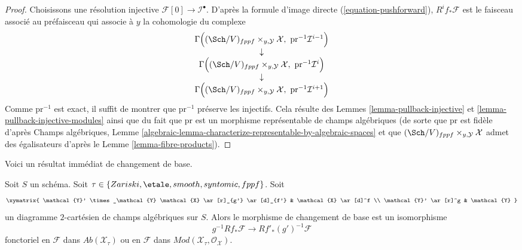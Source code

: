 \begin{proof}
Choisissons une résolution injective $\mathcal{F}[0] \to \mathcal{I}^\bullet$.
D'après la formule d'image directe (\ref{equation-pushforward}),
$R^if_*\mathcal{F}$ est le faisceau associé au préfaisceau qui associe
à $y$ la cohomologie du complexe
$$
\begin{matrix}
\Gamma\Big((\Sch/V)_{fppf} \times_{y, \mathcal{Y}} \mathcal{X},
\ \text{pr}^{-1}\mathcal{I}^{i - 1}\Big) \\
\downarrow \\
\Gamma\Big((\Sch/V)_{fppf} \times_{y, \mathcal{Y}} \mathcal{X},
\ \text{pr}^{-1}\mathcal{I}^i\Big) \\
\downarrow \\
\Gamma\Big((\Sch/V)_{fppf} \times_{y, \mathcal{Y}} \mathcal{X},
\ \text{pr}^{-1}\mathcal{I}^{i + 1}\Big)
\end{matrix}
$$
Comme $\text{pr}^{-1}$ est exact, il suffit de montrer que
$\text{pr}^{-1}$ préserve les injectifs. Cela résulte des
Lemmes \ref{lemma-pullback-injective} et
\ref{lemma-pullback-injective-modules}
ainsi que du fait que $\text{pr}$ est un morphisme représentable de
champs algébriques (de sorte que $\text{pr}$ est fidèle d'après
Champs algébriques, Lemme
\ref{algebraic-lemma-characterize-representable-by-algebraic-spaces}
et que
$(\Sch/V)_{fppf} \times_{y, \mathcal{Y}} \mathcal{X}$
admet des égalisateurs d'après le
Lemme \ref{lemma-fibre-products}).
\end{proof}

\noindent
Voici un résultat immédiat de changement de base.

\begin{lemma}
\label{lemma-base-change-higher-direct-images}
Soit $S$ un schéma. Soit
$\tau \in \{Zariski,\linebreak[0] \etale,\linebreak[0]
smooth,\linebreak[0] syntomic,\linebreak[0] fppf\}$. Soit
$$
\xymatrix{
\mathcal{Y}' \times_\mathcal{Y} \mathcal{X} \ar[r]_{g'} \ar[d]_{f'} &
\mathcal{X} \ar[d]^f \\
\mathcal{Y}' \ar[r]^g & \mathcal{Y}
}
$$
un diagramme $2$-cartésien de champs algébriques sur $S$. Alors le morphisme de
changement de base est un isomorphisme
$$
g^{-1}Rf_*\mathcal{F} \longrightarrow Rf'_*(g')^{-1}\mathcal{F}
$$
fonctoriel en $\mathcal{F}$ dans $\textit{Ab}(\mathcal{X}_\tau)$
ou en $\mathcal{F}$ dans $\textit{Mod}(\mathcal{X}_\tau, \mathcal{O}_\mathcal{X})$.
\end{lemma}

